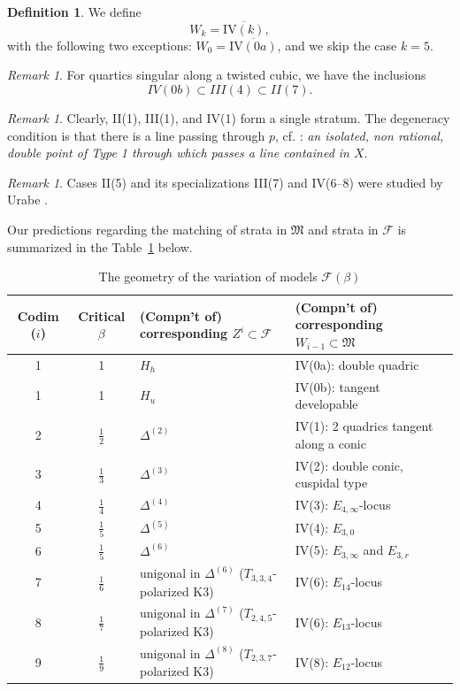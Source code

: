 \documentclass[11pt]{amsart}
\numberwithin{equation}{section}
\theoremstyle{plain}
\theoremstyle{remark}
\newtheorem{remark}[theorem]{Remark}
\theoremstyle{definition}
\newtheorem{definition}[theorem]{Definition}
\newcommand{\cF}{\mathscr{F}}
\newcommand{\gM}{\mathfrak{M}}
\begin{document}
\begin{definition}\label{dfn:doubleuq}
We define
$$W_k=\overline{\mathrm{IV}(k)},$$
with the following two exceptions: $W_0=\overline{\mathrm{IV}(0a)}$, and we skip the case $k=5$.
\end{definition}

\begin{remark}
For quartics singular along a twisted cubic,  we have the inclusions
$$ IV(0b) \subset III(4) \subset II(7).$$
\end{remark}

\begin{remark}
Clearly, II(1), III(1), and IV(1) form a single stratum. The degeneracy condition is that there is a line passing through $p$, cf. \cite[Cor. 2.3 (i)]{shah4}: {\it an isolated, non rational, double point of Type 1 through which passes a line contained in $X$}.
\end{remark}

\begin{remark}
Cases II(5) and its specializations III(7) and IV(6--8) were studied by Urabe \cite{urabee12}. 
\end{remark}

Our predictions regarding the matching of strata in  $\gM$ and strata in $\cF$ is summarized in the Table~\ref{tablemainresult} below. 

\begin{table}[htb!]
\renewcommand{\arraystretch}{1.60}
\begin{tabular}{|c|c|l|l|}
\hline
Codim ($i$) & Critical $\beta$ & (Compn't of) corresponding $Z^{i}\subset\cF$ & (Compn't of) corresponding  $W_{i-1}\subset\gM$\\
\hline
1& 1 &$H_h$& IV(0a): double quadric\\
1& 1 &$H_u$& IV(0b): tangent developable\\

\hline
2& $\frac{1}{2}$ & $\Delta^{(2)}$& IV(1): 2 quadrics tangent along a conic\\
3& $\frac{1}{3}$ & $\Delta^{(3)}$& IV(2): double conic, cuspidal type\\
4&$\frac{1}{4}$ & $\Delta^{(4)}$&IV(3): $E_{4,\infty}$-locus\\
\hline
5&$\frac{1}{5}$ &$\Delta^{(5)}$ & IV(4):  $E_{3,0}$ \\
6&$\frac{1}{5}$ &  $\Delta^{(6)}$ & IV(5): $E_{3,\infty}$ and $E_{3,r}$\\
\hline
7&$\frac{1}{6}$ &unigonal in $\Delta^{(6)}$ ($T_{3,3,4}$-polarized K3)& IV(6): $E_{14}$-locus\\
8&$\frac{1}{7}$ &unigonal in $\Delta^{(7)}$ ($T_{2,4,5}$-polarized K3)& IV(6): $E_{13}$-locus\\
9&$\frac{1}{9}$ &unigonal in $\Delta^{(8)}$ ($T_{2,3,7}$-polarized K3)& IV(8): $E_{12}$-locus \\
\hline
\end{tabular}
\vspace{0.2cm}
\caption{The geometry of the variation of models $\cF(\beta)$}\label{tablemainresult}
\end{table}
 
\end{document}
